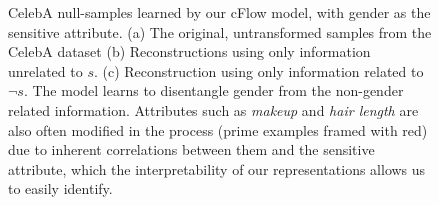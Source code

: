 \begin{figure}[tb]
{      %
      \label{fig:cflow_celeba_recon_s_suppmat}
  }
  \caption{
    CelebA null-samples learned by our cFlow model, with gender as the sensitive attribute.
    (a) The original, untransformed samples from the CelebA dataset
    (b) Reconstructions using only information unrelated to $s$.
    (c) Reconstruction using only information related to $\neg s$.
    The model learns to disentangle gender from the non-gender related information.
    Attributes such as \emph{makeup} and \emph{hair length} are also often modified in the process (prime examples framed with red) due to inherent correlations between them and the sensitive attribute, which the interpretability of our representations allows us to easily identify.
  }\label{fig:celeba_cflow_suppmat}
\end{figure}



